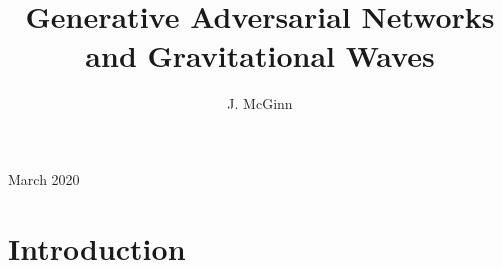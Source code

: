 \documentclass[12pt]{iopart}
\begin{document}
\title{Generative Adversarial Networks and Gravitational Waves}

\author{J. McGinn}

\address{University of Glasgow, Physics \& Astronomy Department, Glasgow G12 8QQ, UK}
\vspace{10pt}
\begin{indented}
\item[]March 2020
\end{indented}

\begin{abstract}

\end{abstract}

%
%
%
% 
%



\section{Introduction}

\end{document}
